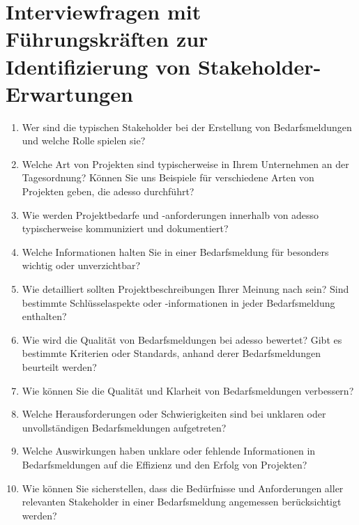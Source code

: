 \documentclass[a4paper,12pt]{scrreprt}
\newcommand{\hiddenchapter}[1]{
	\chapter*{{#1}}
}
\begin{document}
\hiddenchapter{Interviewfragen mit Führungskräften zur Identifizierung von Stakeholder-Erwartungen}
\begin{enumerate}
	\item Wer sind die typischen Stakeholder bei der Erstellung von Bedarfsmeldungen und welche
	Rolle spielen sie?
	\item Welche Art von Projekten sind typischerweise in Ihrem Unternehmen an der Tagesordnung?
	Können Sie uns Beispiele für verschiedene Arten von Projekten geben, die adesso
	durchführt?
	\item Wie werden Projektbedarfe und -anforderungen innerhalb von adesso typischerweise
	kommuniziert und dokumentiert?
	\item Welche Informationen halten Sie in einer Bedarfsmeldung für besonders wichtig oder
	unverzichtbar?
	\item Wie detailliert sollten Projektbeschreibungen Ihrer Meinung nach sein? Sind bestimmte
	Schlüsselaspekte oder -informationen in jeder Bedarfsmeldung enthalten?
	\item Wie wird die Qualität von Bedarfsmeldungen bei adesso bewertet? Gibt es bestimmte
	Kriterien oder Standards, anhand derer Bedarfsmeldungen beurteilt werden?
	\item Wie können Sie die Qualität und Klarheit von Bedarfsmeldungen verbessern?
	\item Welche Herausforderungen oder Schwierigkeiten sind bei unklaren oder unvollständigen
	Bedarfsmeldungen aufgetreten?
	\item Welche Auswirkungen haben unklare oder fehlende Informationen in Bedarfsmeldungen
	auf die Effizienz und den Erfolg von Projekten?
	\item Wie können Sie sicherstellen, dass die Bedürfnisse und Anforderungen aller relevanten
	Stakeholder in einer Bedarfsmeldung angemessen berücksichtigt werden?
\end{enumerate}

\newpage
\setcounter{page}{1}
\pagestyle{fancy}
\setcounter{chapter}{0}











%







%
%
\raggedright
\printbibliography
\end{document}

